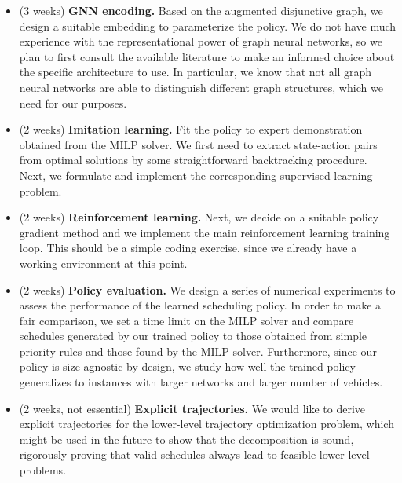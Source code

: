 \documentclass[notitlepage]{report}
\begin{document}
\begin{itemize}
  \item (3 weeks) \textbf{GNN encoding.} Based on the augmented disjunctive graph, we design
        a suitable embedding to parameterize the policy. We do not have much
        experience with the representational power of graph neural networks, so
        we plan to first consult the available literature to make an informed
        choice about the specific architecture to use. In particular, we know
        that not all graph neural networks are able to distinguish different
        graph structures, which we need for our purposes.

  \item (2 weeks) \textbf{Imitation learning.} Fit the policy to expert demonstration
        obtained from the MILP solver. We first need to extract state-action
        pairs from optimal solutions by some straightforward backtracking
        procedure. Next, we formulate and implement the corresponding supervised
        learning problem.

  \item (2 weeks) \textbf{Reinforcement learning.} Next, we decide on a suitable
        policy gradient method and we implement the main reinforcement learning
        training loop. This should be a simple coding exercise, since we already
        have a working environment at this point.

  \item (2 weeks) \textbf{Policy evaluation.} We design a series of numerical experiments to
        assess the performance of the learned scheduling policy. In order to
        make a fair comparison, we set a time limit on the MILP solver and
        compare schedules generated by our trained policy to those obtained from
        simple priority rules and those found by the MILP solver.
        Furthermore, since our policy is size-agnostic by design, we study how
        well the trained policy generalizes to instances with larger networks
        and larger number of vehicles.

  \item (2 weeks, not essential) \textbf{Explicit trajectories.} We would like to
        derive explicit trajectories for the lower-level trajectory optimization
        problem, which might be used in the future to show that the
        decomposition is sound, rigorously proving that valid schedules always
        lead to feasible lower-level problems.
\end{itemize}
\end{document}
